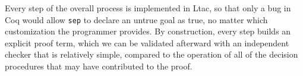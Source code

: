 \documentclass[preprint,nocopyrightspace]{sigplanconf}
\newcommand{\cd}[1]{\texttt{#1}}
\begin{document}
Every step of the overall process is implemented in Ltac, so that only a bug in Coq would allow \cd{sep} to declare an untrue goal as true, no matter which customization the programmer provides.  By construction, every step builds an explicit proof term, which we can be validated afterward with an independent checker that is relatively simple, compared to the operation of all of the decision procedures that may have contributed to the proof.





\end{document}
